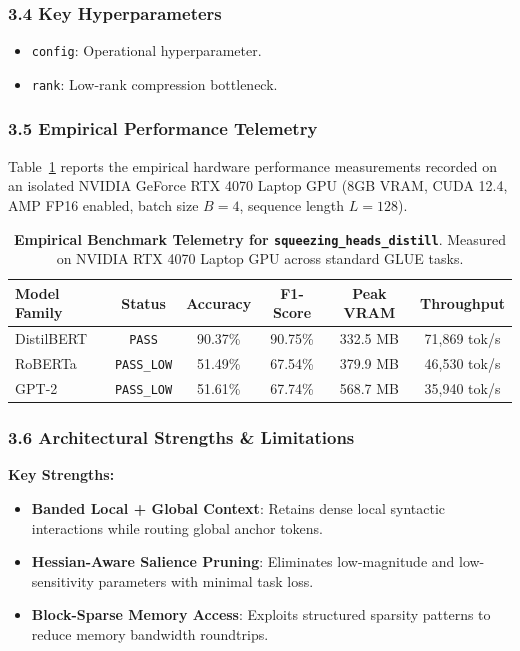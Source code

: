\subsubsection*{3.4 Key Hyperparameters}
\begin{itemize}
    \item \texttt{config}: Operational hyperparameter.
    \item \texttt{rank}: Low-rank compression bottleneck.
\end{itemize}

\subsubsection*{3.5 Empirical Performance Telemetry}
Table~\ref{tab:telemetry_squeezing_heads_distill} reports the empirical hardware performance measurements recorded on an isolated NVIDIA GeForce RTX 4070 Laptop GPU (8GB VRAM, CUDA 12.4, AMP FP16 enabled, batch size $B=4$, sequence length $L=128$).

\begin{table}[h]
\centering
\small
\caption{\textbf{Empirical Benchmark Telemetry for \texttt{squeezing\_heads\_distill}}. Measured on NVIDIA RTX 4070 Laptop GPU across standard GLUE tasks.}
\label{tab:telemetry_squeezing_heads_distill}
\begin{tabular*}{\columnwidth}{@{\extracolsep{\fill}}lccccc}
\toprule
\textbf{Model Family} & \textbf{Status} & \textbf{Accuracy} & \textbf{F1-Score} & \textbf{Peak VRAM} & \textbf{Throughput} \\
\midrule
DistilBERT & \texttt{PASS} & 90.37\% & 90.75\% & 332.5 MB & 71,869 tok/s \\
RoBERTa & \texttt{PASS\_LOW} & 51.49\% & 67.54\% & 379.9 MB & 46,530 tok/s \\
GPT-2 & \texttt{PASS\_LOW} & 51.61\% & 67.74\% & 568.7 MB & 35,940 tok/s \\
\bottomrule
\end{tabular*}
\end{table}

\subsubsection*{3.6 Architectural Strengths \& Limitations}
\textbf{Key Strengths:}
\begin{itemize}
    \item \textbf{Banded Local + Global Context}: Retains dense local syntactic interactions while routing global anchor tokens.
    \item \textbf{Hessian-Aware Salience Pruning}: Eliminates low-magnitude and low-sensitivity parameters with minimal task loss.
    \item \textbf{Block-Sparse Memory Access}: Exploits structured sparsity patterns to reduce memory bandwidth roundtrips.
\end{itemize}

